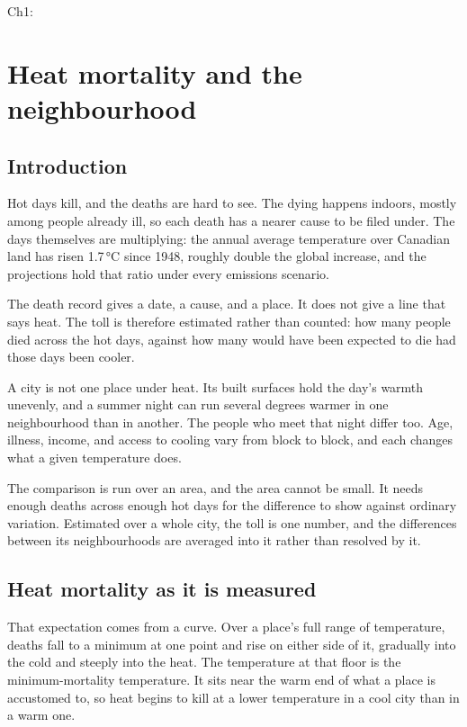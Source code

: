 Ch1: \chapter{Heat mortality and the neighbourhood}\label{chapter:problem}

\section{Introduction}

Hot days kill, and the deaths are hard to see. The dying happens
indoors, mostly among people already ill, so each death has a nearer
cause to be filed under. The days themselves are multiplying: the
annual average temperature over Canadian land has risen 1.7\,°C since
1948, roughly double the global increase, and the projections hold
that ratio under every emissions scenario.

The death record gives a date, a cause, and a place. It does not give a
line that says heat. The toll is therefore estimated rather than counted:
how many people died across the hot days, against how many would have
been expected to die had those days been cooler.

A city is not one place under heat. Its built surfaces hold the day's
warmth unevenly, and a summer night can run several degrees warmer in one
neighbourhood than in another. The people who meet that night differ too.
Age, illness, income, and access to cooling vary from block to block, and
each changes what a given temperature does.

The comparison is run over an area, and the area cannot be small. It needs
enough deaths across enough hot days for the difference to show against
ordinary variation. Estimated over a whole city, the toll is one number,
and the differences between its neighbourhoods are averaged into it rather
than resolved by it.

\section{Heat mortality as it is measured}

That expectation comes from a curve. Over a place's full range of
temperature, deaths fall to a minimum at one point and rise on either side
of it, gradually into the cold and steeply into the heat. The temperature
at that floor is the minimum-mortality temperature. It sits near the warm
end of what a place is accustomed to, so heat begins to kill at a lower
temperature in a cool city than in a warm one.

